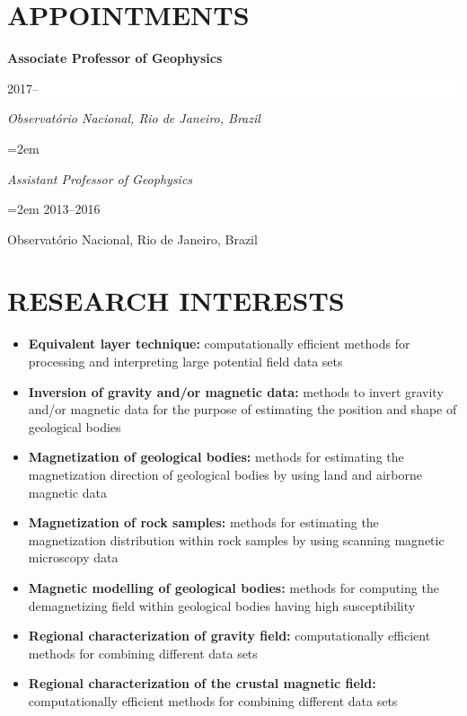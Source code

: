 \documentclass[paper=letter,fontsize=11pt]{scrartcl} %
\newcommand{\NewPart}[2]{\section*{\uppercase{#1} #2}}
\newcommand{\EducationEntry}[4]{
		\noindent \textbf{#1} \hfill      %
		\colorbox{White}{%
			\parbox{10em}{%
			\hfill\color{Black}#2}} \par  %
		\noindent \textit{#3} \par        %
		\noindent\hangindent=2em\hangafter=0 \small #4 %
		\normalsize \par}
\begin{document}
\NewPart{Appointments}{}



\EducationEntry{Associate Professor of Geophysics}{2017--}
{Observat\'{o}rio Nacional, Rio de Janeiro, Brazil}

\EducationEntry{Assistant Professor of Geophysics}{2013--2016}
{Observat\'{o}rio Nacional, Rio de Janeiro, Brazil}

\NewPart{Research interests}{}

{\begin{itemize}

\item{\textbf{Equivalent layer technique:} computationally efficient methods for processing and interpreting large potential field data sets}

\item{\textbf{Inversion of gravity and/or magnetic data:} methods to invert gravity and/or magnetic data for the purpose of estimating the position and shape of geological bodies}

\item{\textbf{Magnetization of geological bodies:} methods for estimating the magnetization direction of geological bodies by using land and airborne magnetic data}

\item{\textbf{Magnetization of rock samples:} methods for estimating the magnetization distribution within rock samples by using scanning magnetic microscopy data}

\item{\textbf{Magnetic modelling of geological bodies:} methods for computing the demagnetizing field within geological bodies having high susceptibility}

\item{\textbf{Regional characterization of gravity field:} computationally efficient methods for combining different data sets}

\item{\textbf{Regional characterization of the crustal magnetic field:} computationally efficient methods for combining different data sets}

\end{itemize}}
\end{document}
